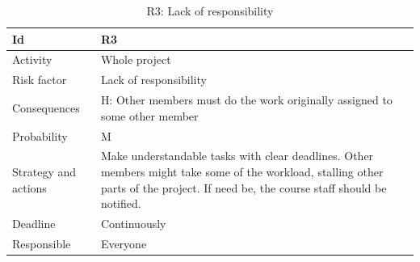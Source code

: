 \documentclass[11pt]{book}
\begin{document}
\begin{table}[H]
\centering
\begin{tabular}{ l  p{11cm} }
    Id                      & R3                                                                          \\ \hline
    Activity                & Whole project                                                              \\ \hline
    Risk factor             & Lack of responsibility                                                      \\ \hline
    Consequences            & H: Other members must do the work originally assigned to some other member  \\ \hline
    Probability             & M                                                                           \\ \hline
    Strategy and actions    & Make understandable tasks with clear deadlines. Other members might take 
                                some of the workload, stalling other parts of the project. If need be, 
                                the course staff should be notified.                                      \\ \hline
    Deadline                & Continuously                                                                \\ \hline
    Responsible             & Everyone                                                                    \\ 
\end{tabular}
\caption{R3: Lack of responsibility}
\label{tab:risk_3}
\end{table}
\end{document}

